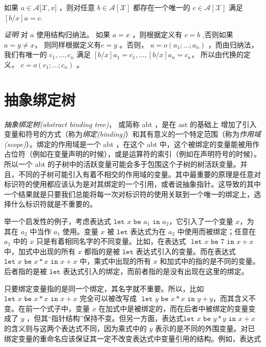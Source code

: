 \begin{theorem}
如果 \(a\in \mathcal{A[X},x]\) ，则对任意
\(b \in \mathcal{A[X]}\) 都存在一个唯一的 \(c\in \mathcal{A[X]}\) 满足
\([b/x]a=c\).
\end{theorem}

\emph{证明} 对 \(a\) 使用结构归纳法。 如果 \(a=x\) ，则根据定义有
\(c=b\) ,否则如果\(a=y\neq x\)， 则同样根据定义有\(c=y\) 。否则，
\(a=o(a_1;\dots;a_n)\) ，而由归纳法，我们有唯一的 \(c_1,\dots,c_n\) 满足
\([b/x]a_1=c_1,\dots,[b/x]a_n=c_n\)， 所以由代换的定义，
\(c=o(c_1;\dots;c_n)\) 。

\section{抽象绑定树}

\emph{抽象绑定树(abstract binding tree)}， 或简称 abt ，是在 ast 的基础上
增加了引入变量和符号的方式（称为\emph{绑定(binding)}）和其有意义的一个特定范围（称为\emph{作用域(scope)}）。绑定的作用域是一个
abt ，在这个 abt
中，这个被绑定的变量能被用作占位符（例如在变量声明的时候），或是运算符的索引（例如在声明符号的时候）。
所以一个 abt
的子树中的活跃变量可能会多于包围这个子树的树活跃变量。并且，不同的子树可能引入有着不相交的作用域的变量。其中最重要的原理是任意对标识符的使用都应该认为是对其绑定的一个引用，或者说抽象指针。这导致的其中一个结果就是只要我们总能将每一次对标识符的使用关联到一个唯一的绑定上，选择什么标识符就是不重要的。

举一个启发性的例子，考虑表达式
\(\texttt{let } x \texttt{ be } a_1 \texttt{ in } a_2\)，它引入了一个变量
\(x\)，为其在 \(a_2\) 中当作 \(a_1\) 使用。变量 \(x\) 被
\(\texttt{let}\) 表达式为在 \(a_2\) 中使用而被绑定；任意在 \(a_1\) 中的
\(x\) 只是有着相同名字的不同变量。比如，在表达式
\(\texttt{ let } x \texttt{ be } 7 \texttt{ in } x+x \)
中，加式中出现的所有 \(x\) 都指的是被 \(\texttt{let}\)
表达式引入的变量。而在表达式
\(\texttt{let } x \texttt{ be } x * x \texttt{ in } x+x \)
中，乘式中出现的所有 \(x\) 和加式中的指的是不同的变量。后者指的是被
\(\texttt{let}\) 表达式引入的绑定，而前者指的是没有出现在这里的绑定。

只要绑定变量指的是同一个绑定，其名字就不重要。所以，比如
\(\texttt{let } x\texttt{ be } x * x \texttt{ in } x+x\)
完全可以被改写成
\(\texttt{ let } y \texttt{ be } x * x \texttt{ in } y+y \)，而其含义不变。在前一个式子中，变量
\(x\) 在加式中是被绑定的，而在后者中被绑定的变量变成了 \(y\)
，但其``指针结构''保持不变。但另一方面，表达式\(\texttt{let } x\texttt{ be } y * y \texttt{ in } x+x\)
的含义则与这两个表达式不同，因为乘式中的 \(y\)
表示的是不同的外围变量。对已绑定变量的重命名应该保证其一定不改变表达式中变量引用的结构。例如，表达式

